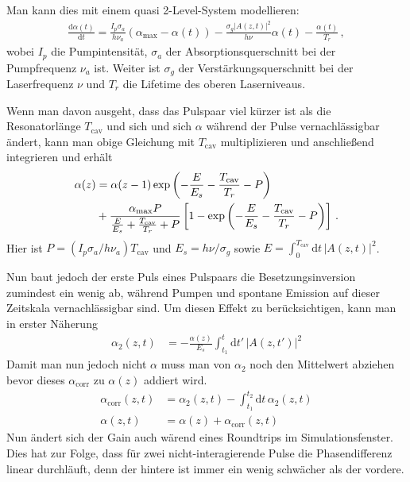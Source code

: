 \documentclass[bachelor,       %
               twoside,        %
               BCOR10mm,       %
               english,ngerman, %
               ]{GAUBM}
\newcommand{\dif}{\ensuremath{\mathrm{d}}}
\begin{document}
Man kann dies mit einem quasi 2-Level-System modellieren:
\begin{align}
	\frac{\dif \alpha(t)}{\dif t}=\frac{I_p\sigma_a}{h\nu_a}(\alpha_\text{max}-\alpha(t))-\frac{\sigma_g|A(z,t)|^2}{h\nu}\alpha(t)-\frac{\alpha(t)}{T_r}\,,
\end{align}
wobei $I_p$ die Pumpintensität, $\sigma_a$ der Absorptionsquerschnitt bei der Pumpfrequenz $\nu_a$ ist.
Weiter ist $\sigma_g$ der Verstärkungsquerschnitt bei der Laserfrequenz $\nu$ und $T_r$ die Lifetime des oberen Laserniveaus.

Wenn man davon ausgeht, dass das Pulspaar viel kürzer ist als die Resonatorlänge $T_\text{cav}$ und sich und sich $\alpha$ während der Pulse vernachlässigbar ändert, kann man obige Gleichung mit $T_\text{cav}$ multiplizieren und anschließend integrieren und erhält
\begin{align}
	\alpha(z)&=\alpha(z-1)\exp\left(-\frac{E}{E_s}-\frac{T_\text{cav}}{T_r}-P\right) \notag \\
	&+\frac{\alpha_\text{max}P}{\frac{E}{E_s}+\frac{T_\text{cav}}{T_r}+P}\left[1-\exp\left(-\frac{E}{E_s}-\frac{T_\text{cav}}{T_r}-P\right)\right]\,.
\end{align}
Hier ist $P=(I_p\sigma_a/h\nu_a)T_\text{cav}$ und $E_s=h\nu/\sigma_g$ sowie $E=\int_0^{T_\text{cav}}\dif t \,|A(z,t)|^2$.

Nun baut jedoch der erste Puls eines Pulspaars die Besetzungsinversion zumindest ein wenig ab, während Pumpen und spontane Emission auf dieser Zeitskala vernachlässigbar sind.
Um diesen Effekt zu berücksichtigen, kann man in erster Näherung
\begin{align}
	\alpha_2(z,t)&=-\frac{\alpha(z)}{E_s}\int_{t_1}^{t} \dif t'\, |A(z,t')|^2
\end{align}
Damit man nun jedoch nicht $\alpha$ muss man von $\alpha_2$ noch den Mittelwert abziehen bevor dieses $\alpha_\text{corr}$ zu $\alpha(z)$ addiert wird.
\begin{align}
	\alpha_\text{corr}(z,t)&=\alpha_2(z,t)-\int_{t_1}^{t_2} \dif t\, \alpha_2(z,t)\\
	\alpha(z,t)&=\alpha(z)+\alpha_\text{corr}(z,t)
\end{align}
Nun ändert sich der Gain auch wärend eines Roundtrips im Simulationsfenster.
Dies hat zur Folge, dass für zwei nicht-interagierende Pulse die Phasendifferenz linear durchläuft, denn der hintere ist immer ein wenig schwächer als der vordere.  
\end{document}
